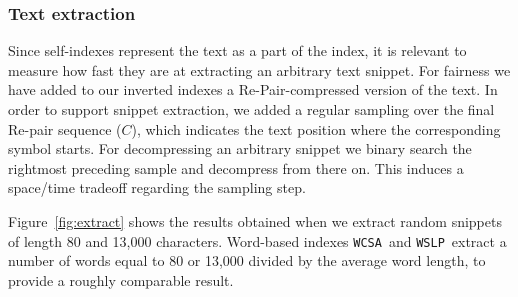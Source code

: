 \documentclass[review]{elsarticle}
\newcommand{\repair}{Re-Pair}
\newcommand{\wcsa}{\texttt{WCSA}}
\newcommand{\wslp}{\texttt{WSLP}}
\begin{document}
\subsubsection{Text extraction} \label{exp:pos:extract}

Since self-indexes represent the text as a part of the index, it is relevant
to measure how fast they are at extracting an arbitrary text snippet. For
fairness we have added to our inverted indexes a \repair-compressed version
of the text. In order to support snippet extraction, we added a regular
sampling over the final Re-pair sequence ($C$), which indicates the text position where the
corresponding symbol starts. For decompressing an arbitrary snippet we binary
search the rightmost preceding sample and decompress from there on. This induces
a space/time tradeoff regarding the sampling step.

Figure~\ref{fig:extract} shows the results obtained when we extract random snippets
of length 80 and 13,000 characters. Word-based indexes \wcsa\ and \wslp\ extract a number of
words equal to 80 or 13,000 divided by the average word length, to provide
a roughly comparable result. 
\end{document}
